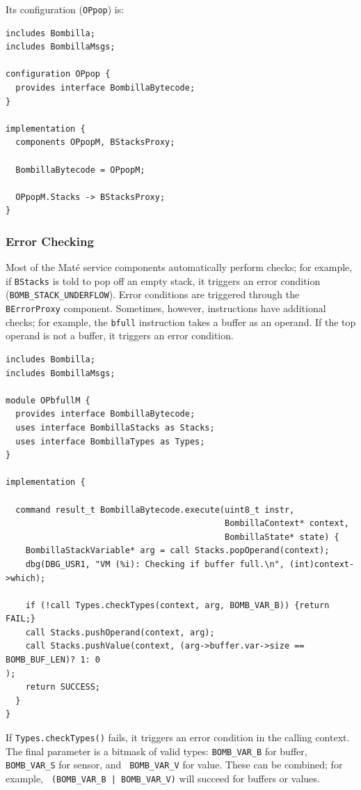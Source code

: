 \documentclass[10pt]{article}
\newcommand{\mate}{Mat\'{e}\xspace}
\begin{document}
Its configuration ({\tt OPpop}) is:

\begin{verbatim}includes Bombilla;
includes BombillaMsgs;

configuration OPpop {
  provides interface BombillaBytecode;
}

implementation {
  components OPpopM, BStacksProxy;
  
  BombillaBytecode = OPpopM;

  OPpopM.Stacks -> BStacksProxy;
}
\end{verbatim}

\subsubsection{Error Checking}

Most of the \mate service components automatically perform checks; for
example, if {\tt BStacks} is told to pop off an empty stack, it
triggers an error condition ({\tt BOMB\_STACK\_UNDERFLOW}). Error
conditions are triggered through the {\tt BErrorProxy}
component. Sometimes, however, instructions have additional checks;
for example, the {\tt bfull} instruction takes a buffer as an
operand. If the top operand is not a buffer, it triggers an error
condition.

\begin{verbatim}
includes Bombilla;
includes BombillaMsgs;

module OPbfullM {
  provides interface BombillaBytecode;
  uses interface BombillaStacks as Stacks;
  uses interface BombillaTypes as Types;
}

implementation {

  command result_t BombillaBytecode.execute(uint8_t instr,
                                            BombillaContext* context,
                                            BombillaState* state) {
    BombillaStackVariable* arg = call Stacks.popOperand(context);
    dbg(DBG_USR1, "VM (%i): Checking if buffer full.\n", (int)context->which);  
                
    if (!call Types.checkTypes(context, arg, BOMB_VAR_B)) {return FAIL;}
    call Stacks.pushOperand(context, arg);
    call Stacks.pushValue(context, (arg->buffer.var->size == BOMB_BUF_LEN)? 1: 0
);
    return SUCCESS;
  }
}
\end{verbatim}

If {\tt Types.checkTypes()} fails, it triggers an error condition in
the calling context. The final parameter is a bitmask of valid types:
{\tt BOMB\_VAR\_B} for buffer, {\tt BOMB\_VAR\_S} for sensor, and {\tt
BOMB\_VAR\_V} for value. These can be combined; for example, {\tt
(BOMB\_VAR\_B | BOMB\_VAR\_V)} will succeed for buffers or values.
\end{document}
